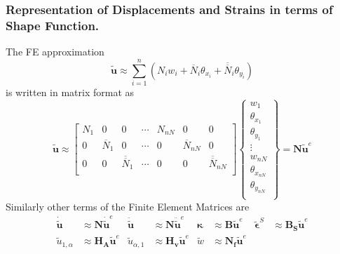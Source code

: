 \documentclass[9pt]{beamer}
\begin{document}
\begin{frame}
\frametitle{Representation of Displacements and Strains in terms of Shape Function.}
The FE approximation 
\begin{equation*}
\tilde{\mathbf{u}} \approx \sum_{i=1}^{n}\left(N_iw_i+\overline{N}_i\theta_{x_i}+\overline{\overline{N}}_i\theta_{y_i}\right)
\end{equation*}
is written in matrix format as
\begin{equation*}
\tilde{\mathbf{u}} \approx 
\begin{bmatrix}
N_1 & 0 & 0  & \cdots & N_{nN} & 0 & 0 \\
0 & \overline{N}_1 & 0  & \cdots & 0 & \overline{N}_{nN} & 0 \\
0 & 0 & \overline{\overline{N}}_1 & \cdots & 0 & 0 & \overline{\overline{N}}_{nN} \\
\end{bmatrix}
\left\{
\begin{array}{r}
w_1 \\
\theta_{x_1} \\
\theta_{y_1} \\
\vdots \\
w_{nN} \\
\theta_{x_{nN}} \\
\theta_{y_{nN}} \\
\end{array} \right\}
=
\mathbf{N} \tilde{\mathbf{u}}^e 
\end{equation*}
Similarly other terms of the Finite Element Matrices are
\begin{align*}
\dot{\tilde{ \mathbf{ u}} } & \approx  \mathbf{N}  \dot{\tilde{\mathbf{u}}}^e
&  
\ddot{\tilde{ \mathbf{ u}} } &  \approx   \mathbf{N}  \ddot{\tilde{\mathbf{u}}}^e
&
\mathbf{ \kappa } & \approx   \mathbf{ B } \tilde{\mathbf{u}}^e
&
\tilde{\mathbf{\epsilon}}^S  & \approx  \mathbf{ B_S }\tilde{\mathbf{u}}^e
\\
\tilde{u}_{1, \alpha}  & \approx  \mathbf{ H_A }\tilde{\mathbf{u}}^e
&
\tilde{u}_{\alpha, 1}  & \approx  \mathbf{ H_v }\tilde{\mathbf{u}}^e
&
\tilde{w}  & \approx  \mathbf{ N_f }\tilde{\mathbf{u}}^e
\end{align*}
\end{frame}
\end{document}
